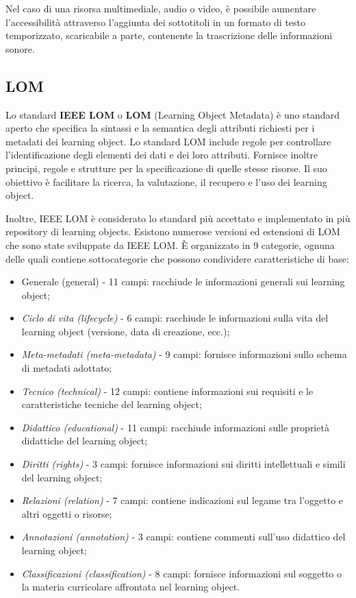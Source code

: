 Nel caso di una risorsa multimediale, audio o video, è possibile aumentare l'accessibilità attraverso l'aggiunta dei sottotitoli in un formato di testo temporizzato, scaricabile a parte, contenente la trascrizione delle informazioni sonore.

\subsection{LOM}
Lo standard \textbf{IEEE LOM} o \textbf{LOM} (Learning Object Metadata) è uno standard aperto che
specifica la sintassi e la semantica degli attributi richiesti per i metadati dei learning object. Lo standard LOM include regole per controllare l'identificazione degli elementi dei dati e dei loro attributi. Fornisce inoltre principi, regole e strutture per la specificazione di quelle stesse risorse. Il suo obiettivo è facilitare la ricerca, la valutazione, il recupero e l'uso dei learning object.

Inoltre, IEEE LOM è considerato lo standard più accettato e implementato in più repository di learning objects. Esistono numerose versioni ed estensioni di LOM che sono state sviluppate da IEEE LOM. È organizzato in 9 categorie, ognuna delle quali contiene sottocategorie che possono condividere caratteristiche di base:

\begin{itemize}
\item Generale (general) - 11 campi: racchiude le informazioni generali sui learning object;
\item \textit{Ciclo di vita (lifecycle)} - 6 campi: racchiude le informazioni sulla vita del learning object (versione, data di creazione, ecc.);
\item \textit{Meta-metadati (meta-metadata)} - 9 campi: fornisce informazioni sullo schema di metadati adottato;
\item \textit{Tecnico (technical)} - 12 campi: contiene informazioni sui requisiti e le caratteristiche tecniche del learning object;
\item \textit{Didattico (educational)} - 11 campi: racchiude informazioni sulle proprietà didattiche del learning object;
\item \textit{Diritti (rights)} - 3 campi: fornisce informazioni sui diritti intellettuali e simili del learning object;
\item \textit{Relazioni (relation)} - 7 campi: contiene indicazioni sul legame tra l'oggetto e altri oggetti o risorse;
\item \textit{Annotazioni (annotation)} - 3 campi: contiene commenti sull'uso didattico del learning object;
\item \textit{Classificazioni (classification)} - 8 campi: fornisce informazioni sul soggetto o la materia curricolare affrontata nel learning object.
\end{itemize}

